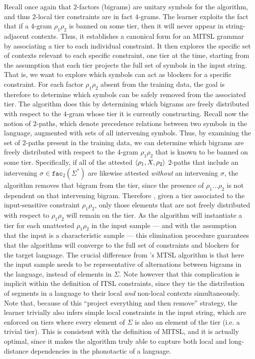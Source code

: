\documentclass[11pt,a4paper]{article}
\newcommand{\facn}[1]{\ensuremath{\texttt{fac}_{#1}}}
\begin{document}
Recall once again that $2$-factors (bigrams) are unitary symbols for the algorithm, and thus $2$-local tier constraints are in fact $4$-grams.
The learner exploits the fact that if a $4$-gram $\rho_1\rho_2$ is banned on some tier, then it will never appear in string-adjacent contexts.
Thus, it establishes a canonical form for an MITSL grammar by associating a tier to each individual constraint.
It then explores the specific set of contexts relevant to each specific constraint, one tier at the time, starting from the assumption that each tier projects the full set of symbols in the input string.
That is, we want to explore which symbols can act as blockers for a specific constraint.
 For each factor $\rho_1\rho_2$ absent from the training data, the goal is therefore to determine which symbols can be safely removed from the associated tier. 
 The algorithm does this by determining which bigrams are freely distributed with respect to the $4$-gram whose tier it is currently constructing.
Recall now the notion of $2$-paths, which denote precedence relations between two symbols in the language, augmented with sets of all intervening symbols.
Thus, by examining the set of $2$-paths present in the training data, we can determine which bigrams are freely distributed with respect to the $4$-gram $\rho_1\rho_2$ that is known to be banned on some tier. 
  Specifically, if all of the attested $\langle{\rho_1, X, \rho_2}\rangle$ $2$-paths that include an intervening $\sigma \in \facn{2}(\Sigma^*)$ are likewise attested \emph{without} an intervening $\sigma$, the algorithm removes that bigram from the tier, since the presence of $\rho_1\ldots{}\rho_2$ is not dependent on that intervening bigram.
Therefore , given a tier associated to the input-sensitive constraint  $\rho_1\rho_2$, only those elements that are not freely distributed with respect to  $\rho_1\rho_2$ will remain on the tier.
As the algorithm will instantiate a tier for each unattested   $\rho_1\rho_2$ in the input sample --- and  with the assumption that the input is a characteristic sample  --- this elimination procedure guarantees that the algorithms will converge to the full set of constraints and blockers for the target language.
  The crucial difference from \citet{McMullinSCIL2019}'s MTSL algorithm is that here the input sample needs to be representative of alternations between bigrams in the language, instead of elements in $\Sigma$.
  Note however that this complication is implicit within the definition of ITSL constraints, since they tie the distribution of segments in a language to their local \emph{and} non-local contexts simultaneously.
  Note that, because of this ``project everything and then remove'' strategy, the learner trivially also infers simple local constraints in the input string, which are enforced on tiers where every element of $\Sigma$ is also an element of the tier (i.e. a trivial tier).
  This is consistent with the definition of MITSL, and it is actually optimal, since it makes the algorithm truly able to capture both local and long-distance dependencies in the phonotactic of a language.
\end{document}

